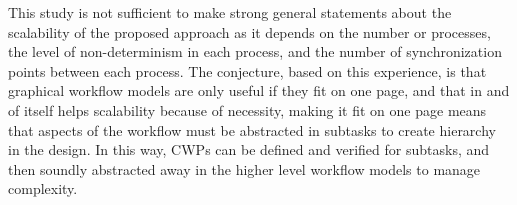 This study is not sufficient to make strong general statements about the scalability of the proposed approach as it depends on the number or processes, the level of non-determinism in each process, and the number of synchronization points between each process. The conjecture, based on this experience, is that graphical workflow models are only useful if they fit on one page, and that in and of itself helps scalability because of necessity, making it fit on one page means that aspects of the workflow must be abstracted in subtasks to create hierarchy in the design. In this way, CWPs can be defined and verified for subtasks, and then soundly abstracted away in the higher level workflow models to manage complexity.